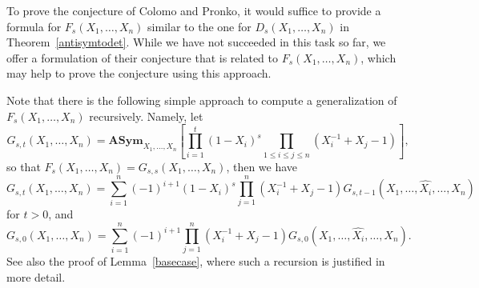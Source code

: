 \documentclass[12pt,dvipsnames]{amsart}
\theoremstyle{definition}
\newcommand{\asym}{\mathbf{ASym}}
\begin{document}
To prove the conjecture of Colomo and Pronko, it would suffice to provide a formula for 
$F_s(X_1,\ldots,X_n)$ similar to the one for $D_s(X_1,\ldots,X_n)$ in Theorem~\ref{antisymtodet}. 
While we have not succeeded in this task so far, we offer a formulation of their conjecture that
is related to $F_s(X_1,\ldots,X_n)$, which may help to prove the conjecture using this approach. 

Note that there is the following simple approach to compute a generalization of $F_{s}(X_1,\ldots,X_n)$ recursively. Namely, let 
$$
G_{s,t}(X_1,\ldots,X_n)= \asym_{X_1,\ldots,X_n} \left[ \prod_{i=1}^t (1-X_i)^s 
\prod_{1 \le i \le j \le n} (X_i^{-1}+ X_j-1) \right],
$$
so that $F_s(X_1,\ldots,X_n)=G_{s,s}(X_1,\ldots,X_n)$, 
then we have  
$$
G_{s,t}(X_1,\ldots,X_n) = \sum_{i=1}^n (-1)^{i+1} (1-X_i)^{s} \prod_{j=1}^n (X_i^{-1}+X_j-1) 
G_{s,t-1}(X_1,\ldots,\widehat{X_i},\ldots,X_n)
$$
for $t>0$, and 
$$
G_{s,0}(X_1,\ldots,X_n) = \sum_{i=1}^n (-1)^{i+1} \prod_{j=1}^n (X_i^{-1}+X_j-1) 
G_{s,0}(X_1,\ldots,\widehat{X_i},\ldots,X_n).
$$
See also the proof of  Lemma~\ref{basecase}, where such a recursion is justified in more detail.
\end{document}
